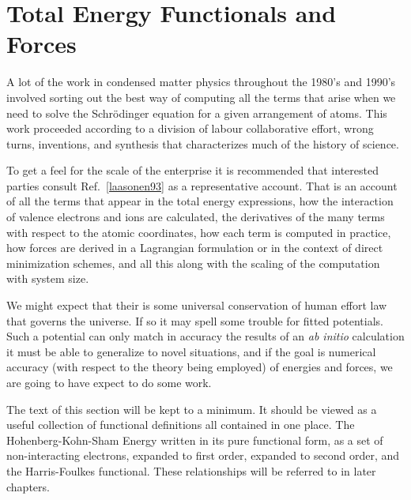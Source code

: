 \section{Total Energy Functionals and Forces}
A lot of the work in condensed matter physics throughout the 1980's and 1990's
involved sorting out the best way of computing all the terms that arise
when we need to solve the Schr\"odinger equation for a given arrangement
of atoms. This work proceeded according to a division of labour collaborative
effort, wrong turns, inventions, and synthesis that characterizes much of the history
of science. 

To get a feel for the scale of the enterprise it is recommended that interested 
parties consult Ref.~\ref{laasonen93} as a representative account.
That is an account of all the terms that appear in the total energy expressions, 
how the interaction of valence electrons and ions are calculated,
the derivatives of the many terms with respect to the atomic coordinates, 
how each term is computed in practice, how forces are derived in
a Lagrangian formulation or in the context of direct minimization schemes, and
all this along with the scaling of the computation with system size.

We might expect that their is some universal conservation of human effort law that governs
the universe. If so it may spell some trouble for fitted potentials. Such a potential
can only match in accuracy the results of an {\it ab initio} calculation it must be
able to generalize to novel situations, and if the goal is numerical accuracy (with respect
to the theory being employed) of energies and forces, we are going to have expect
to do some work.


The text of this section will be kept to a minimum. It should be viewed as a
useful collection of functional definitions all contained in one place. 
The Hohenberg-Kohn-Sham Energy written in its pure functional form,
as a set of non-interacting electrons, expanded to first order, expanded to
second order, and the Harris-Foulkes functional. These relationships will
be referred to in later chapters.

